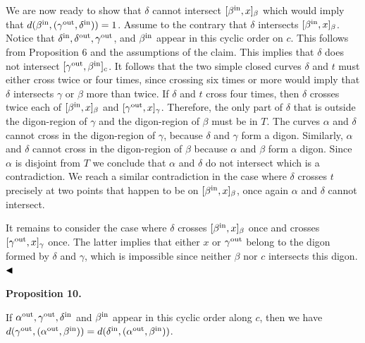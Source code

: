 \par
\par
We are now ready to show that $\delta$ cannot intersect $[\beta^{\rm in},x]_{\beta}$ which would imply that $d(\beta^{\rm in},(\gamma^{\rm out},\delta^{\rm in}))=1$. Assume to the contrary that $\delta$ intersects $[\beta^{\rm in},x]_{\beta}$. Notice that $\delta^{\rm in},\delta^{\rm out},\gamma^{\rm out}$, and $\beta^{\rm in}$ appear in this cyclic order on $c$. This follows from Proposition 6 and the assumptions of the claim. This implies that $\delta$ does not intersect $[\gamma^{\rm out},\beta^{\rm in}]_{c}$. It follows that the two simple closed curves $\delta$ and $t$ must either cross twice or four times, since crossing six times or more would imply that $\delta$ intersects $\gamma$ or $\beta$ more than twice. If $\delta$ and $t$ cross four times, then $\delta$ crosses twice each of $[\beta^{\rm in},x]_{\beta}$ and $[\gamma^{\rm out},x]_{\gamma}$. Therefore, the only part of $\delta$ that is outside the digon-region of $\gamma$ and the digon-region of $\beta$ must be in $T$. The curves $\alpha$ and $\delta$ cannot cross in the digon-region of $\gamma$, because $\delta$ and $\gamma$ form a digon. Similarly, $\alpha$ and $\delta$ cannot cross in the digon-region of $\beta$ because $\alpha$ and $\beta$ form a digon. Since $\alpha$ is disjoint from $T$ we conclude that $\alpha$ and $\delta$ do not intersect which is a contradiction. We reach a similar contradiction in the case where $\delta$ crosses $t$ precisely at two points that happen to be on $[\beta^{\rm in},x]_{\beta}$, once again $\alpha$ and $\delta$ cannot intersect.
\par
\par
It remains to consider the case where $\delta$ crosses $[\beta^{\rm in},x]_{\beta}$ once and crosses $[\gamma^{\rm out},x]_{\gamma}$ once. The latter implies that either $x$ or $\gamma^{\rm out}$ belong to the digon formed by $\delta$ and $\gamma$, which is impossible since neither $\beta$ nor $c$ intersects this digon. $\hfill\blacktriangleleft$
\par
\par
\par\medskip\noindent\textbf{Proposition 10.}\par
If $\alpha^{\rm out},\gamma^{\rm out},\delta^{\rm in}$ and $\beta^{\rm in}$ appear in this cyclic order along $c$, then we have $d(\gamma^{\rm out},(\alpha^{\rm out},\beta^{\rm in}))=d(\delta^{\rm in},(%
\alpha^{\rm out},\beta^{\rm in}))$.
\par
\par
